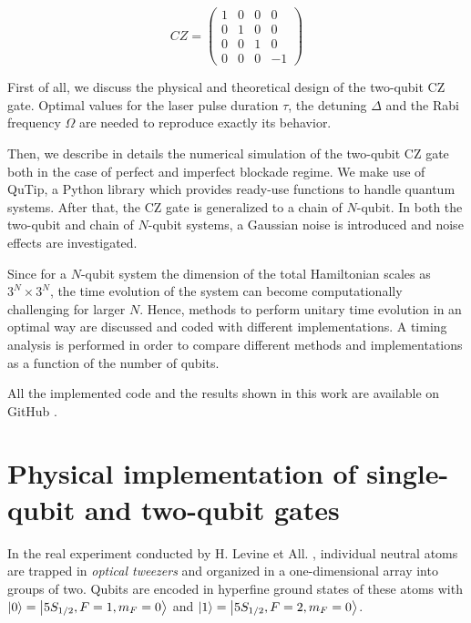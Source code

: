 \documentclass[rmp,10pt,onecolumn,fleqn,notitlepage]{revtex4-1}
\begin{document}
\begin{equation}
    CZ = 
    \begin{pmatrix}
     1 & 0 & 0 & 0 \\ 
     0 & 1 & 0 & 0 \\ 
     0 & 0 & 1 & 0 \\
     0 & 0 & 0 & -1
    \end{pmatrix}
\label{eq:controlled-Zgate}
\end{equation}

First of all, we discuss the physical and theoretical design of the two-qubit CZ gate. Optimal values for the laser pulse duration $\tau$, the detuning $\Delta$ and the Rabi frequency $\Omega$ are needed to reproduce exactly its behavior.

Then, we describe in details the numerical simulation of the two-qubit CZ gate both in the case of perfect and imperfect blockade regime. We make use of QuTip, a Python library which provides  ready-use  functions to  handle  quantum  systems. After that, the CZ gate is generalized to a chain of $N$-qubit.
In both the two-qubit and chain of $N$-qubit systems, a Gaussian noise is introduced and noise effects are investigated. 

Since for a $N$-qubit system the dimension of the total Hamiltonian scales as $3^N\times3^N$, the time evolution of the system can become computationally challenging for larger $N$. Hence, methods to perform unitary time evolution in an optimal way are discussed and coded with different implementations. 
A timing analysis is performed in order to compare different methods and implementations as a function of the number of qubits. 

All the implemented code and the results shown in this work are available on GitHub \cite{github}.



\clearpage

\section{Physical implementation of single-qubit and two-qubit gates}
\label{sec:physical_implementation}

In the real experiment conducted by H. Levine et All. \cite{PhysRevLett.123.170503}, individual neutral atoms are trapped in \textit{optical tweezers} and organized in a one-dimensional array into groups of two. Qubits are encoded in hyperfine ground states of these atoms with $\left\vert{0}\right\rangle=\left\vert{5 S_{1/2}, F=1, m_F=0 }\right\rangle$ and $\left\vert{1}\right\rangle=\left\vert{5 S_{1/2}, F=2, m_F=0 }\right\rangle$. 
\end{document}
